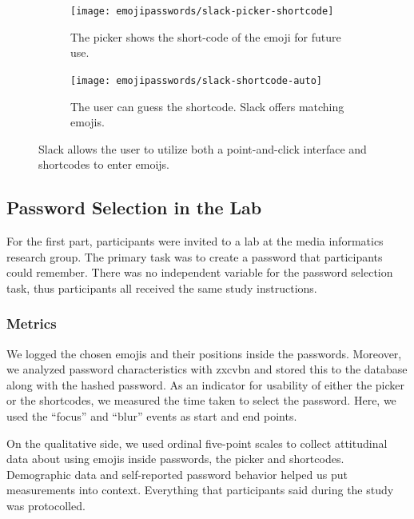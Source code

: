 \begin{figure}
	\centering
	\begin{subfigure}[t]{0.49\textwidth}
	\texttt{[image: emojipasswords/slack-picker-shortcode]}
	\caption{\label{fig:emojipasswords:slack-picker} The picker shows the short-code of the emoji for future use.}
	\end{subfigure}
	\begin{subfigure}[t]{0.49\textwidth}
	\texttt{[image: emojipasswords/slack-shortcode-auto]}
	\caption{\label{fig:emojipasswords:slack-picker-shortcode} The user can guess the shortcode. Slack offers matching emojis.}
	\end{subfigure}
	\caption{\label{fig:emojipasswords:slack-emoji-interaction}
		Slack allows the user to utilize both a point-and-click interface and shortcodes to enter emoijs.
	} 
\end{figure}


\subsection{Password Selection in the Lab}
For the first part, participants were invited to a lab at the media informatics research group. The primary task was to create a password that participants could remember. There was no independent variable for the password selection task, thus participants all received the same study instructions. 

\subsubsection{Metrics}
We logged the chosen emojis and their positions inside the passwords. Moreover, we analyzed password characteristics with zxcvbn and stored this to the database along with the hashed password. 
As an indicator for usability of either the picker or the shortcodes, we measured the time taken to select the password. Here, we used the ``focus'' and ``blur'' events as start and end points. 

On the qualitative side, we used ordinal five-point scales to collect attitudinal data about using emojis inside passwords, the picker and shortcodes. Demographic data and self-reported password behavior helped us put measurements into context. 
Everything that participants said during the study was protocolled. 

